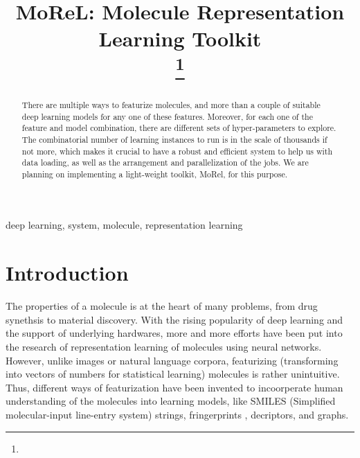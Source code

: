 \documentclass[conference]{IEEEtran}
\begin{document}
\title{MoReL: Molecule Representation Learning Toolkit\\
	{
		\footnotesize \textsuperscript{}
	}
		\thanks{}
}

\author{
}

\maketitle

\begin{abstract}

There are multiple ways to featurize molecules, and more than a couple of suitable deep learning models for any one of these features. 
Moreover, for each one of the feature and model combination, there are different sets of hyper-parameters to explore. 
The combinatorial number of learning instances to run is in the scale of thousands if not more, which makes it crucial to have a robust and efficient system to help us with data loading, as well as the arrangement and parallelization of the jobs. 
We are planning on implementing a light-weight toolkit, MoRel, for this purpose. 

\end{abstract}

\begin{IEEEkeywords}
deep learning, system, molecule, representation learning
\end{IEEEkeywords}

\section{Introduction} \label{sec_intro} 

The properties of a molecule is at the heart of many problems, from drug synethsis to material discovery. 
With the rising popularity of deep learning and the support of underlying hardwares, more and more efforts have been put into the research of representation learning of molecules using neural networks. 
However, unlike images or natural language corpora, featurizing (transforming into vectors of numbers for statistical learning) molecules is rather unintuitive. 
Thus, different ways of featurization have been invented to incoorperate human understanding of the molecules into learning models, like SMILES (Simplified molecular-input line-entry system) strings, fringerprints \cite{ecfp}, decriptors, and graphs. 
\end{document}
